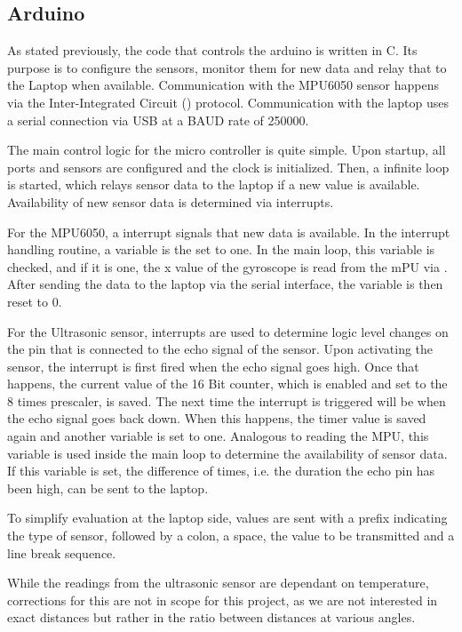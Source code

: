 \subsection{Arduino}
\label{subsec:arduino}

As stated previously, the code that controls the arduino is written in C.
Its purpose is to configure the sensors, monitor them for new data and relay that to the Laptop when available.
Communication with the MPU6050 sensor happens via the Inter-Integrated Circuit (\IIC) protocol.
Communication with the laptop uses a serial connection via USB at a BAUD rate of 250000.

The main control logic for the micro controller is quite simple. Upon startup, all ports and sensors are configured and the clock is initialized.
Then, a infinite loop is started, which relays sensor data to the laptop if a new value is available.
Availability of new sensor data is determined via interrupts.

For the MPU6050, a interrupt signals that new data is available. In the interrupt handling routine, a variable is the set to one.
In the main loop, this variable is checked, and if it is one, the x value of the gyroscope is read from the mPU via \IIC.
After sending the data to the laptop via the serial interface, the variable is then reset to 0.

For the Ultrasonic sensor, interrupts are used to determine logic level changes on the pin that is connected to the echo signal of the sensor.
Upon activating the sensor, the interrupt is first fired when the echo signal goes high.
Once that happens, the current value of the 16 Bit counter, which is enabled and set to the 8 times prescaler, is saved.
The next time the interrupt is triggered will be when the echo signal goes back down.
When this happens, the timer value is saved again and another variable is set to one. Analogous to reading the MPU,
this variable is used inside the main loop to determine the availability of sensor data. If this variable is set,
the difference of times, i.e. the duration the echo pin has been high, can be sent to the laptop.

To simplify evaluation at the laptop side, values are sent with a prefix indicating the type of sensor,
followed by a colon, a space, the value to be transmitted and a line break sequence.

While the readings from the ultrasonic sensor are dependant on temperature, corrections for this are not in scope for this project, as we are not interested in exact distances but rather in the ratio between distances at various angles.
